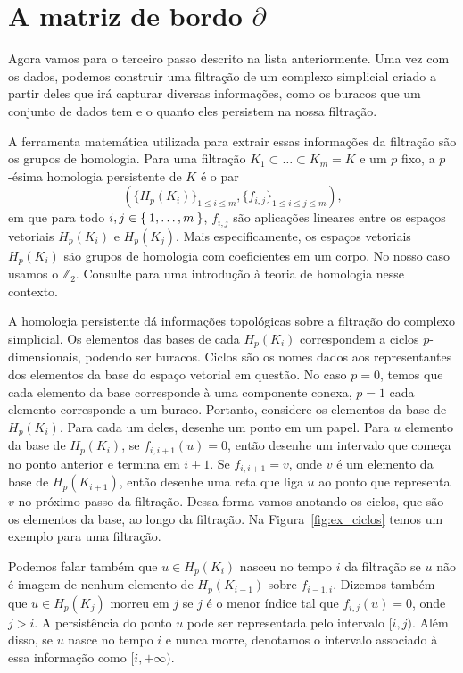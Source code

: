 \section{A matriz de bordo $\partial$}
Agora vamos para o terceiro passo descrito na lista anteriormente.
Uma vez com os dados, podemos construir uma filtração de um complexo simplicial
criado a partir deles que irá capturar diversas informações, como os buracos
que um conjunto de dados tem e o quanto eles persistem na nossa filtração.

A ferramenta matemática utilizada para extrair essas informações da filtração
são os grupos de homologia. Para uma filtração $K_1 \subset \dots \subset K_m=K$ e um
$p$ fixo, a $p$-ésima homologia persistente de $K$ é o par
\begin{equation}
  \label{eq:seq_hom}
  \left( \{H_p(K_i)\}_{1\leq i \leq m}, \{f_{i,j}\}_{1\leq i \leq j \leq m} \right),
\end{equation}
em que para todo $i,j \in \Set{1,\dots,m}$, $f_{i,j}$ são aplicações lineares
entre os espaços vetoriais $H_p(K_i)$ e $H_p(K_j)$. Mais especificamente,
os espaços vetoriais $H_p(K_i)$ são grupos de homologia com coeficientes
em um corpo. No nosso caso usamos o $\mathbb{Z}_2$.
Consulte \cite{edelsbrunner2010computational} para uma introdução à teoria de homologia nesse contexto.

A homologia persistente dá informações topológicas sobre a filtração do complexo simplicial.
Os elementos das bases de cada $H_p(K_i)$ correspondem a ciclos $p$-dimensionais,
podendo ser buracos. Ciclos são os nomes dados aos representantes dos elementos da base
do espaço vetorial em questão. No caso $p=0$, temos que cada elemento da base corresponde
à uma componente conexa, $p=1$ cada elemento corresponde a um buraco.
Portanto, considere os elementos da base de $H_p(K_i)$. Para cada um deles,
desenhe um ponto em um papel. Para $u$ elemento da base de $H_p(K_i)$, se $f_{i,i+1}(u)=0$, 
então desenhe um intervalo que começa no ponto anterior e termina
em $i+1$. Se $f_{i,i+1}=v$, onde $v$ é um elemento da base de $H_p(K_{i+1})$,
então desenhe uma reta que liga $u$ ao ponto que representa $v$ no próximo passo
da filtração. Dessa forma vamos anotando os ciclos, que são os elementos da base,
ao longo da filtração. Na Figura~\ref{fig:ex_ciclos} temos um exemplo para uma filtração.

Podemos falar também que $u\in H_p(K_i)$ nasceu no tempo $i$ da filtração se
$u$ não é imagem de nenhum elemento de $H_p(K_{i-1})$ sobre $f_{i-1,i}$.
Dizemos também que $u \in H_p(K_j)$ morreu em $j$ se $j$ é o menor índice tal que
$f_{i,j}(u) = 0$, onde $j>i$. A persistência do ponto $u$ pode ser representada pelo intervalo
$[i,j)$. Além disso, se $u$ nasce no tempo $i$ e nunca morre, denotamos o intervalo
associado à essa informação como $[i, +\infty)$.

